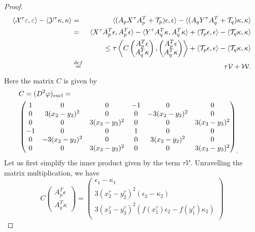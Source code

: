 \documentclass[10pt,a4paper]{amsart}
\newcommand{\eucl}{\operatorname{eucl}}
\begin{document}
\begin{proof}
\begin{eqnarray*}
\langle \mathcal{X}^\tau\varepsilon,\varepsilon\rangle-\langle \mathcal{Y}^\tau\kappa,\kappa\rangle
&=& \langle(A_pX^\tau A^T_p+\mathcal{T}_p)\epsilon,\epsilon\rangle-\langle(A_qY^\tau A^T_q+\mathcal{T}_q)\kappa,\kappa\rangle\\
&=&\langle X^\tau A^T_p\epsilon,A^T_p\epsilon\rangle-\langle Y^\tau A^T_q\kappa,A^T_q\kappa\rangle+\langle \mathcal{T}_p\epsilon,\epsilon\rangle-\langle \mathcal{T}_q\kappa,\kappa\rangle\\
& &\leq\tau\left\langle C
\begin{pmatrix} A^T_p\epsilon\\A^T_q\kappa \end{pmatrix},
\begin{pmatrix} A^T_p\epsilon\\A^T_q\kappa \end{pmatrix}\right\rangle +\langle \mathcal{T}_p\epsilon,\epsilon\rangle-\langle \mathcal{T}_q\kappa,\kappa\rangle \\
 & \stackrel{\textmd{def}}{=} & \tau\mathcal{V}+\mathcal{W}. 
\end{eqnarray*}
Here the matrix $C$ is given by 
\begin{eqnarray*}
\lefteqn{C=(D^2\varphi)_{\eucl}=}& & \\
& \begin{pmatrix}
1& 0 & 0 &-1 & 0 & 0 \\
0& 3(x_2-y_2)^2 & 0 & 0 & -3(x_2-y_2)^2 & 0 \\
0& 0 & 3(x_3-y_3)^2 & 0 & 0 & 3(x_3-y_3)^2 \\
-1& 0 & 0 & 1 & 0 & 0 \\
0 & -3(x_2-y_2)^2 & 0 & 0& 3(x_2-y_2)^2 & 0 \\
 0 & 0 & 3(x_3-y_3)^2 & 0& 0 & 3(x_3-y_3)^2 
\end{pmatrix}_. 
\end{eqnarray*}
Let us first simplify the inner product given by the term $\tau\mathcal{V}$. 
Unravelling the matrix multiplication, we have 
\begin{equation*}
C \begin{pmatrix} A^T_p\epsilon\\A^T_q\kappa \end{pmatrix} = 
\begin{pmatrix}
\epsilon_1-\kappa_1\\
 3(x_2^\tau-y_2^\tau)^2 (\epsilon_2-\kappa_2)\\
 3(x_3^\tau-y_3^\tau)^2(f(x_1^\tau)\epsilon_2-f(y_1^\tau)\kappa_2)\\

\end{pmatrix}
\end{equation*}
\end{proof}
\end{document}

